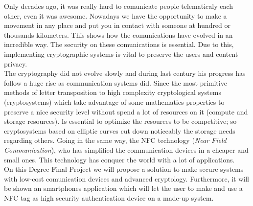 \documentclass[../PFC.tex]{subfiles}
\begin{document}

Only decades ago, it was really hard to comunicate people telematicaly each other, even it was awesome. Nowadays we have the opportunity to make a movement in any place and put you in contact with someone at hundred or thousands kilometers. This shows how the comunications have evolved in an incredible way. The security on these comunications is essential. Due to this, implementing cryptographic systems is vital to preserve the users and content privacy.
\*
\vspace{0.5515cm}
\\
The cryptography did not evolve slowly and during last century his progress has follow a huge rise as communication systems did. Since the most primitive methods of letter transposition to high complexity cryptological systems (cryptosystems) which take advantage of some mathematics properties to preserve a nice security level without spend a lot of resources on it (compute and storage resources). Is essential to optimize the resources to be competitive; so cryptosystems based on elliptic curves cut down noticeably the storage needs regarding others. Going in the same way, the NFC technology (\textit{Near Field Communication}), who has simplified the communication devices in a cheaper and small ones. This technology has conquer the world with a lot of applications.
\*
\vspace{0.5515cm}
\\
On this Degree Final Project we will propose a solution to make secure systems with low-cost comunication devices and advanced cryptology. Furthermore, it will be shown an smartphones application which will let the user to make and use a NFC tag as high security authentication device on a made-up system.
\*
\vspace{0.5515cm}
\\
\end{document}
